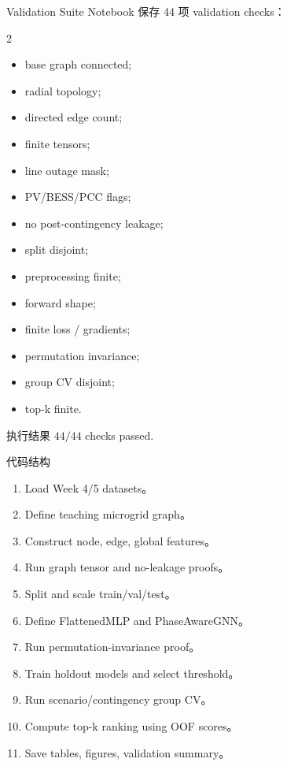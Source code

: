 \documentclass[aspectratio=169,11pt]{beamer}
\begin{document}
\begin{frame}{Validation Suite}
Notebook 保存 44 项 validation checks：
\begin{multicols}{2}
\begin{itemize}
  \item base graph connected;
  \item radial topology;
  \item directed edge count;
  \item finite tensors;
  \item line outage mask;
  \item PV/BESS/PCC flags;
  \item no post-contingency leakage;
  \item split disjoint;
  \item preprocessing finite;
  \item forward shape;
  \item finite loss / gradients;
  \item permutation invariance;
  \item group CV disjoint;
  \item top-k finite.
\end{itemize}
\end{multicols}
\begin{exampleblock}{执行结果}
$44/44$ checks passed.
\end{exampleblock}
\end{frame}

\begin{frame}{代码结构}
\small
\begin{enumerate}
  \item Load Week 4/5 datasets。
  \item Define teaching microgrid graph。
  \item Construct node, edge, global features。
  \item Run graph tensor and no-leakage proofs。
  \item Split and scale train/val/test。
  \item Define FlattenedMLP and PhaseAwareGNN。
  \item Run permutation-invariance proof。
  \item Train holdout models and select threshold。
  \item Run scenario/contingency group CV。
  \item Compute top-k ranking using OOF scores。
  \item Save tables, figures, validation summary。
\end{enumerate}
\end{frame}
\end{document}
